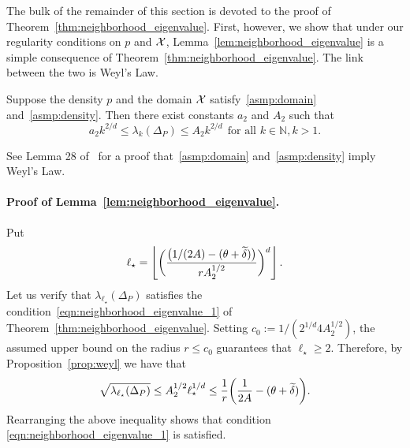 
The bulk of the remainder of this section is devoted to the proof of Theorem~\ref{thm:neighborhood_eigenvalue}. First, however, we show that under our regularity conditions on $p$ and $\mathcal{X}$, Lemma~\ref{lem:neighborhood_eigenvalue} is a simple consequence of Theorem~\ref{thm:neighborhood_eigenvalue}. The link between the two is Weyl's Law.
\begin{proposition}
	\label{prop:weyl}
	Suppose the density $p$ and the domain $\mathcal{X}$ satisfy~\ref{asmp:domain} and~\ref{asmp:density}. Then there exist constants $a_2$ and $A_2$ such that
	\begin{equation}
	\label{eqn:weyls_law}
	a_2k^{2/d} \leq \lambda_k(\Delta_P) \leq A_2k^{2/d}~~\textrm{for all $k \in \mathbb{N}, k > 1$}.
	\end{equation}
\end{proposition}
See Lemma 28 of~\citet{dunlop2020} for a proof that~\ref{asmp:domain} and~\ref{asmp:density} imply Weyl's Law.

\paragraph{Proof of Lemma~\ref{lem:neighborhood_eigenvalue}.}
Put
\begin{equation*}
\ell_{\star} = \left\lfloor \biggl(\frac{\bigl(1/(2A) - (\theta + \widetilde{\delta})\bigr)}{rA_2^{1/2}}\biggr)^d \right\rfloor.
\end{equation*}
Let us verify that $\lambda_{\ell_{\star}}(\Delta_P)$ satisfies the condition~\eqref{eqn:neighborhood_eigenvalue_1} of Theorem~\ref{thm:neighborhood_eigenvalue}. Setting $c_0 := 1/(2^{1/d}4A_2^{1/2})$, the assumed upper bound on the radius $r \leq c_0$ guarantees that $\ell_{\star} \geq 2$. Therefore, by Proposition~\ref{prop:weyl} we have that
\begin{align*}
\sqrt{\lambda_{\ell_{\star}}(\Delta_P)} \leq A_2^{1/2}\ell_{\star}^{1/d} \leq  \frac{1}{r}\biggl(\frac{1}{2A} - (\theta + \widetilde{\delta})\biggr).
\end{align*}
Rearranging the above inequality shows that condition \eqref{eqn:neighborhood_eigenvalue_1} is satisfied. 

